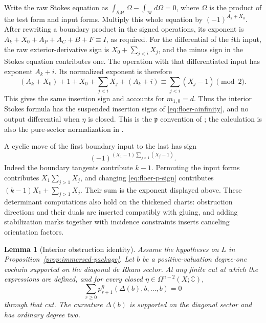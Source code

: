 \documentclass[11pt]{article}
\numberwithin{equation}{section}
\newtheorem{lemma}[theorem]{Lemma}
\theoremstyle{definition}
\theoremstyle{remark}
\begin{document}
Write the raw Stokes equation as
$\int_{\partial\mathcal M}\Omega-\int_{\mathcal M}d\Omega=0$,
where $\Omega$ is the product of the test form and input forms.
Multiply this whole equation by $(-1)^{A_k+X_0}$.  After rewriting
a boundary product in the signed operations, its exponent is
$A_k+X_0+A_P+A_C+B+F\equiv I$, as required.
For the differential of the $i$th input, the raw exterior-derivative
sign is $X_0+\sum_{j<i}X_j$, and the minus sign in the Stokes
equation contributes one.  The operation with that differentiated
input has exponent $A_k+i$.  Its normalized exponent is therefore
\[
 (A_k+X_0)+1+X_0+\sum_{j<i}X_j+(A_k+i)
 \equiv\sum_{j<i}(X_j-1)\pmod2.
\]
This gives the same insertion sign and accounts for $m_{1,0}=d$.
Thus the interior Stokes formula has the suspended insertion signs
of \eqref{eq:floer-ainfinity}, and no output differential when $\eta$
is closed.  This is the $\mathfrak p$ convention of
\cite[Section~3.8]{Floer:FOOO}; the calculation is also the pure-sector
normalization in \cite[Section~6]{W}.

A cyclic move of the first boundary input to the last has sign
\begin{equation}
 \label{eq:floer-cyclic-sign}
 (-1)^{(X_1-1)\sum_{j>1}(X_j-1)}.
\end{equation}
Indeed the boundary tangents contribute $k-1$.  Permuting the input
forms contributes $X_1\sum_{j>1}X_j$, and changing
\eqref{eq:floer-p-sign} contributes
$(k-1)X_1+\sum_{j>1}X_j$.  Their sum is the exponent displayed above.
These determinant computations also hold on the thickened charts:
obstruction directions and their duals are inserted compatibly with
gluing, and adding stabilization marks together with incidence
constraints inserts canceling orientation factors.

\begin{lemma}[Interior obstruction identity]
 \label{lem:interior-identity}
Assume the hypotheses on $L$ in Proposition~\ref{prop:immersed-package}.
Let $b$ be a positive-valuation degree-one cochain supported on the
diagonal de Rham sector.  At any finite cut at which the expressions are
defined, and for every closed $\eta\in\Omega^{n-2}(X;\mathbb C)$,
\begin{equation}
 \label{eq:floer-interior-identity}
 \sum_{r\geq0}p^\eta_{r+1}(\Delta(b),b,\ldots,b)=0
\end{equation}
through that cut.  The curvature $\Delta(b)$ is supported on the
diagonal sector and has ordinary degree two.
\end{lemma}
\end{document}
